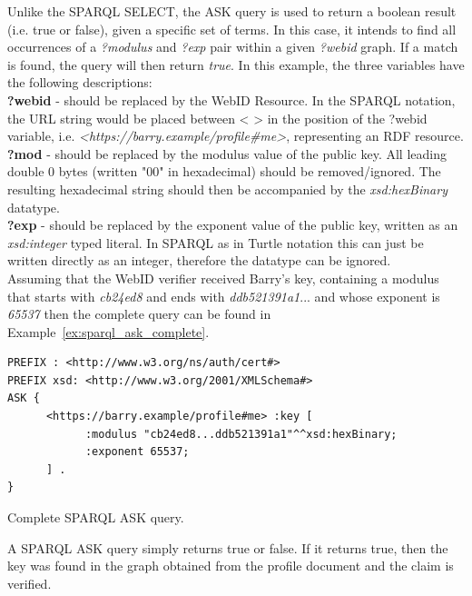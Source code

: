 Unlike the SPARQL SELECT, the ASK query is used to return a boolean result (i.e. true or false), given a specific set of terms. In this case, it intends to find all occurrences of a \textit{?modulus} and \textit{?exp} pair within a given \textit{?webid} graph. If a match is found, the query will then return \textit{true}. In this example, the three variables have the following descriptions:\\

\textbf{?webid} - should be replaced by the WebID Resource. In the SPARQL notation, the URL string would be placed between < > in the position of the ?webid variable, i.e. \textit{<https://barry.example/profile\#me>}, representing an RDF resource.\\

\textbf{?mod} - should be replaced by the modulus value of the public key. All leading double 0 bytes (written "00" in hexadecimal) should be removed/ignored. The resulting hexadecimal string should then be accompanied by the \textit{xsd:hexBinary} datatype.\\

\textbf{?exp} - should be replaced by the exponent value of the public key, written as an \textit{xsd:integer} typed literal. In SPARQL as in Turtle notation this can just be written directly as an integer, therefore the datatype can be ignored.\\

Assuming that the WebID verifier received Barry's key, containing a modulus that starts with \textit{cb24ed8} and ends with \textit{ddb521391a1}... and whose exponent is \textit{65537} then the complete query can be found in Example~\ref{ex:sparql_ask_complete}.

\begin{example}
\begin{verbatim}
PREFIX : <http://www.w3.org/ns/auth/cert#>
PREFIX xsd: <http://www.w3.org/2001/XMLSchema#>
ASK {
      <https://barry.example/profile#me> :key [
            :modulus "cb24ed8...ddb521391a1"^^xsd:hexBinary;
            :exponent 65537;
      ] .
}
\end{verbatim}
\caption{Complete SPARQL ASK query.}
\label{ex:sparql_ask_complete}
\end{example}

A SPARQL ASK query simply returns true or false. If it returns true, then the key was found in the graph obtained from the profile document and the claim is verified.\\

